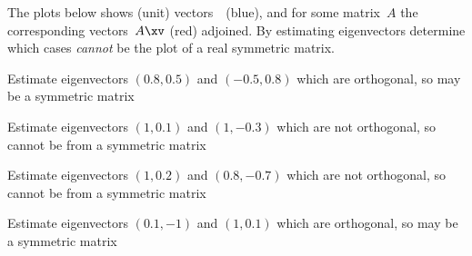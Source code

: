 \begin{example} \label{eg:}
The plots below shows (unit) vectors~\xv\ (blue), and for some matrix~\(A\) the corresponding vectors~\(A\xv\) (red) adjoined. 
By estimating eigenvectors determine which cases \emph{cannot} be the plot of a real symmetric matrix.
\begin{parts}

\item {}
\begin{solution} 
Estimate eigenvectors \((0.8,0.5)\) and \((-0.5,0.8)\) which are  orthogonal, so may be a symmetric matrix 
\end{solution}


\item {}
\begin{solution} 
Estimate eigenvectors \((1,0.1)\) and \((1,-0.3)\) which are not orthogonal, so cannot be from a symmetric matrix 
\end{solution}

\item {}
\begin{solution} 
Estimate eigenvectors \((1,0.2)\) and \((0.8,-0.7)\) which are not orthogonal, so cannot be from a symmetric matrix 
\end{solution}

\item {}
\begin{solution} 
Estimate eigenvectors \((0.1,-1)\) and \((1,0.1)\) which are orthogonal, so may be a symmetric matrix 
\end{solution}

\end{parts}
\end{example}



